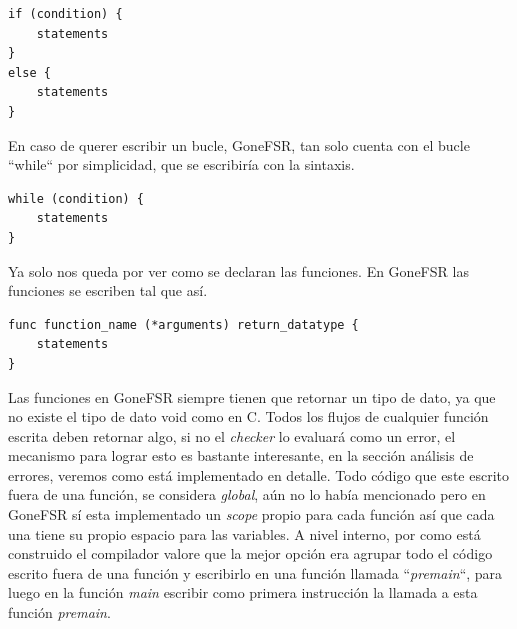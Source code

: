 \begin{lstlisting}[style=goneStyle]
if (condition) {
    statements
}
else {
    statements
}
\end{lstlisting}

\noindent En caso de querer escribir un bucle, GoneFSR, tan solo cuenta con el bucle ``while`` por simplicidad, que se escribiría con la sintaxis.

\begin{lstlisting}[style=goneStyle]
while (condition) {
    statements
}
\end{lstlisting}

\noindent Ya solo nos queda por ver como se declaran las funciones. En GoneFSR las funciones se escriben tal que así.
\begin{lstlisting}[style=goneStyle]
func function_name (*arguments) return_datatype {
    statements
}
\end{lstlisting}
Las funciones en GoneFSR siempre tienen que retornar un tipo de dato, ya que no existe el tipo de dato void como en C. Todos los flujos de cualquier función escrita deben retornar algo, si no el \textit{checker} lo evaluará como un error, el mecanismo para lograr esto es bastante interesante, en la sección análisis de errores, veremos como está implementado en detalle. Todo código que este escrito fuera de una función, se considera \textit{global}, aún no lo había mencionado pero en GoneFSR sí esta implementado un \textit{scope} propio para cada función así que cada una tiene su propio espacio para las variables. A nivel interno, por como está construido el compilador valore que la mejor opción era agrupar todo el código escrito fuera de una función y escribirlo en una función llamada ``\textit{premain}``, para luego en la función \textit{main} escribir como primera instrucción la llamada a esta función \textit{premain}.



